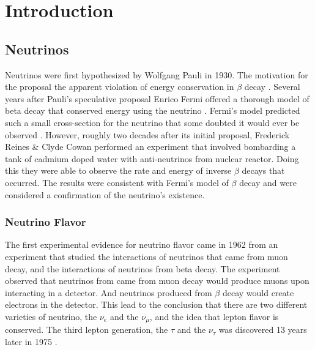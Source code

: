 
\chapter{Introduction}

\ifpdf
    \graphicspath{{introduction/figures/PNG/}{introduction/figures/PDF/}{introduction/figures/}}
\else
    \graphicspath{{introduction/figures/EPS/}{introduction/figures/}}
\fi


\section{Neutrinos}
Neutrinos were first hypothesized by Wolfgang Pauli in 1930.
The motivation for the proposal the apparent violation of energy
conservation in $\beta$ decay \citep{pauli_letter}.
Several years after Pauli's speculative proposal Enrico Fermi offered
a thorough model of beta decay that conserved energy using the neutrino
\citep{fermi_beta_decay}.
Fermi's model predicted such a small cross-section for the neutrino that some
doubted it would ever be observed \citep{bethe_impossible_to_observe}.
However, roughly two decades after its initial proposal, Frederick Reines \&
Clyde Cowan performed an experiment that involved bombarding a tank of cadmium
doped water with anti-neutrinos from nuclear reactor.
Doing this they were able to observe the rate and energy of inverse $\beta$
decays that occurred.
The results were consistent with Fermi's model of $\beta$ decay and were
considered a confirmation of the neutrino's existence.

\subsection{Neutrino Flavor}
The first experimental evidence for neutrino flavor came in 1962 from an
experiment \citep{lederman_muon_flavor} that studied the interactions of
neutrinos that came from muon decay, and the interactions of neutrinos
from beta decay.
The experiment observed that neutrinos from came from muon decay would produce
muons upon interacting in a detector.
And neutrinos produced from $\beta$ decay would create electrons in the
detector.
This lead to the conclusion that there are two different varieties of neutrino,
the $\nu_e$ and the $\nu_{\mu}$, and the idea that lepton flavor is conserved.
The third lepton generation, the $\tau$ and the $\nu_{\tau}$ was discovered 13
years later in 1975 \citep{tau_discovery}.

